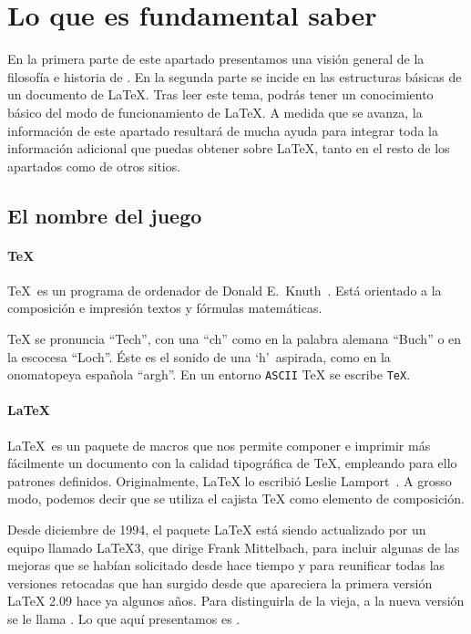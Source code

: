 \section{Lo que es fundamental saber}

\begin{intro} En  la primera  parte de  este apartado  presentamos una
visión general de  la filosofía e historia de  \textrm{\LaTeXe}. En la
segunda parte se incide en las  estructuras básicas de un documento de
\LaTeX. Tras leer  este tema, podrás tener un  conocimiento básico del
modo  de  funcionamiento  de  \LaTeX.  A  medida  que  se  avanza,  la
información de  este apartado resultará  de mucha ayuda  para integrar
toda la información  adicional que puedas obtener  sobre \LaTeX, tanto
en el resto de los apartados como de otros sitios. \end{intro}

\subsection{El nombre del juego}

\paragraph{\TeX}

\TeX\ es  un programa de ordenador  de Donald E.~Knuth~\cite{texbook}.
Está  orientado  a  la  composición  e  impresión  textos  y  fórmulas
matemáticas.

\TeX{}  se pronuncia  ``Tech'',  con  una ``ch''  como  en la  palabra
alemana ``Buch'' o  en la escocesa ``Loch''. Éste es  el sonido de una
`h'\ aspirada, como en la onomatopeya española ``argh''. En un entorno
\texttt{ASCII} \TeX{} se escribe \texttt{TeX}.

\paragraph{\LaTeX}

\LaTeX\ es  un paquete de macros  que nos permite componer  e imprimir
más  fácilmente  un documento  con  la  calidad tipográfica  de  \TeX,
empleando  para ello  patrones definidos.  Originalmente, \LaTeX{}  lo
escribió Leslie Lamport~\cite{llmanual}.
A grosso  modo, podemos decir  que se  utiliza el cajista  \TeX{} como
elemento de composición.

Desde diciembre de  1994, el paquete \LaTeX{}  está siendo actualizado
por  un equipo  llamado  \LaTeX 3,  que
dirige Frank  Mittelbach, para incluir
algunas de  las mejoras que se  habían solicitado desde hace  tiempo y
para reunificar  todas las versiones  retocadas que han  surgido desde
que  apareciera la  primera versión  \LaTeX{}  2.09  hace  ya   algunos  años.  Para  distinguirla  de
la  vieja,  a  la  nueva   versión  se  le  llama  \LaTeXe. Lo que aquí presentamos es \LaTeXe.

